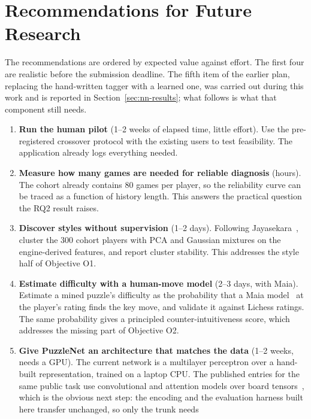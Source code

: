 \section{Recommendations for Future Research}\label{sec:future}

The recommendations are ordered by expected value against effort. The first four are realistic before
the submission deadline. The fifth item of the earlier plan, replacing the hand-written tagger with a
learned one, was carried out during this work and is reported in Section~\ref{sec:nn-results}; what
follows is what that component still needs.

\begin{enumerate}
  \item \textbf{Run the human pilot} (1--2 weeks of elapsed time, little effort). Use the pre-registered
        crossover protocol with the existing users to test feasibility. The application already logs
        everything needed.
  \item \textbf{Measure how many games are needed for reliable diagnosis} (hours). The cohort already
        contains 80 games per player, so the reliability curve can be traced as a function of history
        length. This answers the practical question the RQ2 result raises.
  \item \textbf{Discover styles without supervision} (1--2 days). Following
        Jayasekara~\cite{jayasekara2018classification}, cluster the 300 cohort players with PCA and
        Gaussian mixtures on the engine-derived features, and report cluster stability. This addresses
        the style half of Objective O1.
  \item \textbf{Estimate difficulty with a human-move model} (2--3 days, with Maia). Estimate a mined
        puzzle's difficulty as the probability that a Maia model~\cite{mcilroyyoung2020aligning} at the
        player's rating finds the key move, and validate it against Lichess ratings. The same
        probability gives a principled counter-intuitiveness score, which addresses the missing part of
        Objective O2.
  \item \textbf{Give PuzzleNet an architecture that matches the data} (1--2 weeks, needs a GPU). The
        current network is a multilayer perceptron over a hand-built representation, trained on a laptop
        CPU. The published entries for the same public task use convolutional and attention models over
        board tensors~\cite{schutt2024estimating,milosz2024transformers}, which is the obvious next step:
        the encoding and the evaluation harness built here transfer unchanged, so only the trunk needs

\end{enumerate}
